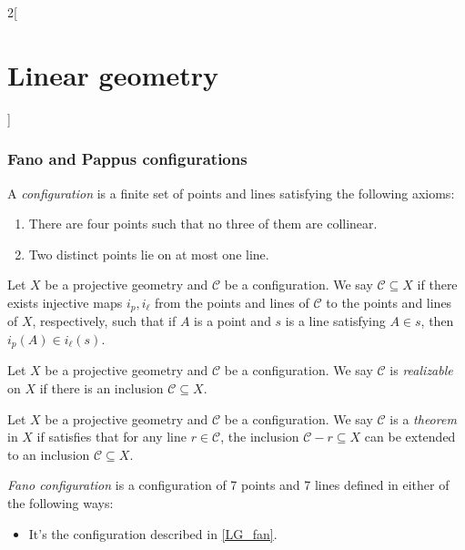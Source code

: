 \documentclass[../../../main.tex]{subfiles}
\begin{document}
\begin{multicols}{2}[\section{Linear geometry}]
  \subsubsection{Fano and Pappus configurations}
  \begin{definition}
    A \emph{configuration} is a finite set of points and lines satisfying the following axioms:
    \begin{enumerate}
      \item There are four points such that no three of them are collinear.
      \item Two distinct points lie on at most one line.
    \end{enumerate}
  \end{definition}
  \begin{definition}
    Let $X$ be a projective geometry and $\mathcal{C}$ be a configuration. We say $\mathcal{C}\subseteq X$ if there exists injective maps $i_p,i_\ell$ from the points and lines of $\mathcal{C}$ to the points and lines of $X$, respectively, such that if $A$ is a point and $s$ is a line satisfying $A\in s$, then $i_p(A)\in i_\ell(s)$.
  \end{definition}
  \begin{definition}
    Let $X$ be a projective geometry and $\mathcal{C}$ be a configuration. We say $\mathcal{C}$ is \emph{realizable} on $X$ if there is an inclusion $\mathcal{C}\subseteq X$.
  \end{definition}
  \begin{definition}
    Let $X$ be a projective geometry and $\mathcal{C}$ be a configuration. We say $\mathcal{C}$ is a \emph{theorem} in $X$ if satisfies that for any line $r\in\mathcal{C}$, the inclusion $\mathcal{C}-r\subseteq X$ can be extended to an inclusion $\mathcal{C}\subseteq X$.
  \end{definition}
  \begin{definition}
    \emph{Fano configuration} is a configuration of 7 points and 7 lines defined in either of the following ways:
    \begin{itemize}
      \item It's the configuration described in \cref{LG_fan}.
            \begin{center}
              \begin{minipage}{\linewidth}
                \centering
                
                \label{LG_fan}
              \end{minipage}

\end{center}
\end{itemize}
\end{definition}
\end{multicols}
\end{document}
